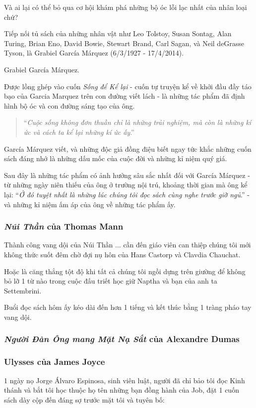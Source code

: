 \documentclass{article}
\begin{document}
Và ai lại có thể bỏ qua cơ hội khám phá những bộ óc lỗi lạc nhất của nhân loại chứ?

Tiếp nối tủ sách của những nhân vật như Leo Tolstoy, Susan Sontag, Alan Turing, Brian Eno, David Bowie, Stewart Brand, Carl Sagan, và Neil deGrasse Tyson, là Grabiel García Márquez (6/3/1927 - 17/4/2014).

\textsf{Grabiel García Márquez.}

%
Được lồng ghép vào cuốn \textit{Sống để Kể lại} - cuốn tự truyện kể về khởi đầu đầy táo bạo của Garcia Marquez trên con đường viết lách - là những tác phẩm đã định hình bộ óc và con đường sáng tạo của ông.

\begin{quotation}
	``\textit{Cuộc sống không đơn thuần chỉ là những trải nghiệm, mà còn là những kí ức và cách ta kể lại những kí ức ấy}.''
\end{quotation}
García Márquez viết, và những độc giả đồng điệu biết ngay tức khắc những cuốn sách đáng nhớ là những dấu mốc của cuộc đời và những kỉ niệm quý giá.

%
Sau đây là những tác phẩm có ảnh hưởng sâu sắc nhất đối với García Márquez - từ những ngày niên thiếu của ông ở trường nội trú, khoảng thời gian mà ông kể lại: ``\textit{Ở đó tuyệt nhất là những lúc chúng tôi đọc sách cùng nghe trước giờ ngủ}.'' - và những kỉ niệm ấm áp của ông về những tác phẩm ấy.

\subsubsection{\textit{Núi Thần} của Thomas Mann}
Thành công vang dội của Núi Thần $\ldots$ cần đến giáo viên can thiệp chúng tôi mới không thức suốt đêm chờ đợi nụ hôn của Hans Castorp và Clavdia Chauchat.

Hoặc là căng thẳng tột độ khi tất cả chúng tôi ngồi dựng trên giường để không bỏ lỡ 1 từ nào trong cuộc đấu triết học giữ Naptha và bạn của anh ta Settembrini.

Buổi đọc sách hôm ấy kéo dài đến hơn 1 tiếng và kết thúc bằng 1 tràng pháo tay vang dội.

\subsubsection{\textit{Người Đàn Ông mang Mặt Nạ Sắt} của Alexandre Dumas}

\subsubsection{Ulysses của James Joyce}
1 ngày nọ Jorge Álvaro Espinosa, sinh viên luật, người đã chỉ bảo tôi đọc Kinh thánh và bắt tôi học thuộc họ tên những bạn đồng hành của Job, đặt 1 cuốn sách dày cộp đến đáng sợ trước mặt tôi và tuyên bố:
\end{document}
